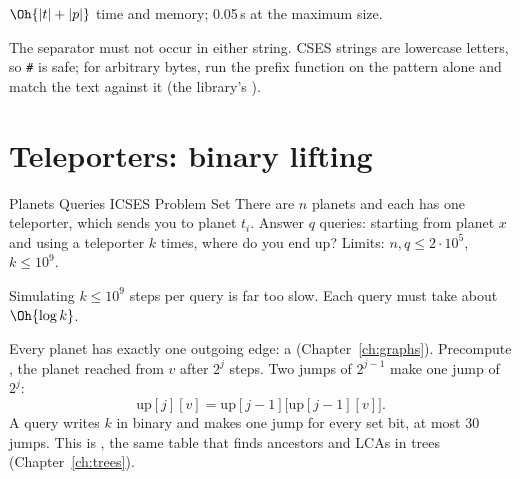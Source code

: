  $\Oh{|t| + |p|}$ time and memory; 0.05\,s at the maximum size.

\begin{pitfall}
The separator must not occur in either string. CSES strings are lowercase letters, so \texttt{\#} is safe; for arbitrary
bytes, run the prefix function on the pattern alone and match the text against it (the library's ).
\end{pitfall}

\section[Teleporters]{Teleporters: binary lifting \hfill \gold}\label{wp:planets}

\begin{statement}{Planets Queries I}{CSES Problem Set}
There are $n$ planets and each has one teleporter, which sends you to planet $t_i$. Answer $q$ queries: starting from planet
$x$ and using a teleporter $k$ times, where do you end up? Limits: $n, q \le 2\cdot10^5$, $k \le 10^9$.
\end{statement}

 Simulating $k \le 10^9$ steps per query is far too slow. Each query must take about $\Oh{\log k}$.

 Every planet has exactly one outgoing edge: a  (Chapter~\ref{ch:graphs}).
Precompute , the planet reached from $v$ after $2^j$ steps. Two jumps of $2^{j-1}$ make one jump of $2^j$:
\[
  \mathrm{up}[j][v] = \mathrm{up}[j-1]\bigl[\mathrm{up}[j-1][v]\bigr].
\]
A query writes $k$ in binary and makes one jump for every set bit, at most 30 jumps. This is , the same
table that finds ancestors and LCAs in trees (Chapter~\ref{ch:trees}).


